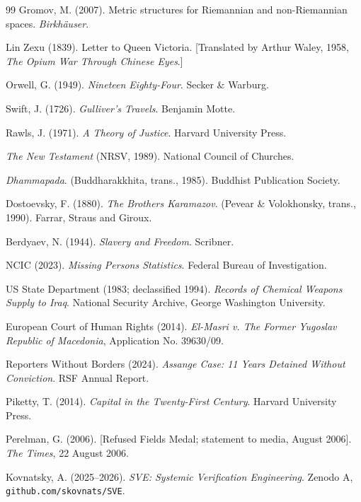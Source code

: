 \documentclass[11pt,a4paper]{article}
\theoremstyle{definition}
\theoremstyle{remark}
\begin{document}
\begin{thebibliography}{99}
Gromov, M. (2007).
Metric structures for Riemannian and non-Riemannian spaces.
\textit{Birkhäuser}.

Lin Zexu (1839).
Letter to Queen Victoria.
[Translated by Arthur Waley, 1958,
\textit{The Opium War Through Chinese Eyes}.]

Orwell, G. (1949).
\textit{Nineteen Eighty-Four}.
Secker \& Warburg.

Swift, J. (1726).
\textit{Gulliver's Travels}.
Benjamin Motte.

Rawls, J. (1971).
\textit{A Theory of Justice}.
Harvard University Press.

\textit{The New Testament} (NRSV, 1989).
National Council of Churches.

\textit{Dhammapada}.
(Buddharakkhita, trans., 1985).
Buddhist Publication Society.

Dostoevsky, F. (1880).
\textit{The Brothers Karamazov}.
(Pevear \& Volokhonsky, trans., 1990).
Farrar, Straus and Giroux.

Berdyaev, N. (1944).
\textit{Slavery and Freedom}.
Scribner.

NCIC (2023).
\textit{Missing Persons Statistics}.
Federal Bureau of Investigation.

US State Department (1983; declassified 1994).
\textit{Records of Chemical Weapons Supply to Iraq}.
National Security Archive, George Washington University.

European Court of Human Rights (2014).
\textit{El-Masri v. The Former Yugoslav Republic of Macedonia},
Application No. 39630/09.

Reporters Without Borders (2024).
\textit{Assange Case: 11 Years Detained Without Conviction}.
RSF Annual Report.

Piketty, T. (2014).
\textit{Capital in the Twenty-First Century}.
Harvard University Press.

Perelman, G. (2006).
[Refused Fields Medal; statement to media, August 2006].
\textit{The Times}, 22 August 2006.

Kovnatsky, A. (2025--2026).
\textit{SVE: Systemic Verification Engineering}.
Zenodo A, \texttt{github.com/skovnats/SVE}.

\end{thebibliography}
\end{document}
